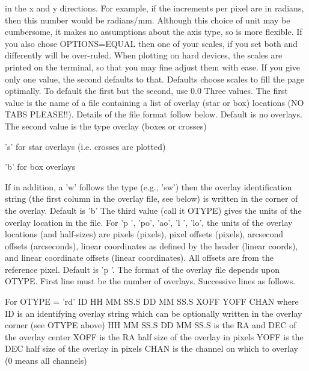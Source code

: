 {in the  x and y directions.  For example, if the increments 
per pixel are in radians, then this number would be radians/mm.
Although this choice of unit may be cumbersome, it makes no 
assumptions about the axis type, so is more flexible.   If you 
also chose OPTIONS=EQUAL then one of your scales, if you set 
both and differently will be over-ruled.  When plotting on hard
devices, the scales are printed on the terminal, so that you may
fine adjust them with ease.
If you give only one value, the second defaults to that. 
Defaults choose scales to fill the page optimally. To default 
the first but the second, use 0.0
Three values.   
\newline\newline The first value is the name of a file containing a list of
overlay (star or box) locations (NO TABS PLEASE!!). 
Details of the file format follow below.
Default is no overlays.
\newline\newline The second value is the type overlay (boxes or crosses)
\par 's'   for star overlays (i.e. crosses are plotted)
\par 'b'   for box overlays 
\par  If in addition, a 'w' follows the type (e.g., 'sw') then the
   overlay identification string (the first column in the overlay
   file, see below) is written in the corner of the overlay. 
   Default is 'b'
\newline\newline The third value (call it OTYPE) gives the units of the overlay 
   location in the file.   For 'p ', 'po', 'ao', 'l ', 'lo', the
   units of the overlay locations (and half-sizes) are pixels 
   (pixels), pixel offsets (pixels), arcsecond offsets
   (arcseconds), linear coordinates as defined by the header 
   (linear coords), and linear coordinate offsets (linear 
   coordinates).  All offsets are from the reference pixel. 
   Default is 'p '.
\newline\newline The format of the overlay file depends upon OTYPE.
First line must be the number of overlays.  
Successive lines as follows.

For OTYPE = 'rd'
{\eightpoint\begintt
  ID   HH MM SS.S   DD MM SS.S   XOFF   YOFF  CHAN
\endtt}
where ID is an identifying overlay string which can be 
optionally written in the overlay corner (see OTYPE above)
HH MM SS.S DD MM SS.S is the RA and DEC of the overlay center
XOFF is the RA half size of the overlay in pixels
YOFF is the DEC half size of the overlay in pixels
CHAN is the channel on which to overlay (0 means all channels)

}
